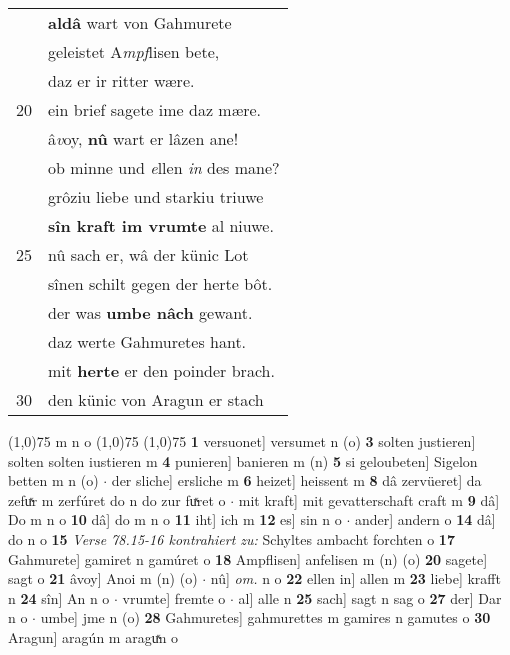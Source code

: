 \documentclass[8pt,a4paper,notitlepage]{article}
\begin{document}
\begin{table}[ht]
\begin{minipage}[t]{0.5\linewidth}
\begin{tabular}{rl}
 & \textbf{aldâ} wart von Gahmurete\\ 
 & geleistet A\textit{mpf}lisen bete,\\ 
 & daz er ir ritter wære.\\ 
20 & ein brief sagete ime daz mære.\\ 
 & â\textit{v}oy, \textbf{nû} wart er lâzen ane!\\ 
 & ob minne und \textit{e}llen \textit{in} des mane?\\ 
 & grôziu liebe und starkiu triuwe\\ 
 & \textbf{sîn kraft im vrumte} al niuwe.\\ 
25 & nû sach er, wâ der künic Lot\\ 
 & sînen schilt gegen der herte bôt.\\ 
 & der was \textbf{umbe nâch} gewant.\\ 
 & daz werte Gahmuretes hant.\\ 
 & mit \textbf{herte} er den poinder brach.\\ 
30 & den künic von Aragun er stach\\ 
\end{tabular}
\scriptsize
\line(1,0){75} \newline
m n o \newline
\line(1,0){75} \newline
\newline
\line(1,0){75} \newline
\textbf{1} versuonet] versumet n (o) \textbf{3} solten justieren] solten solten iustieren m \textbf{4} punieren] banieren m (n) \textbf{5} si geloubeten] Sigelon betten m n (o)  $\cdot$ der sliche] ersliche m \textbf{6} heizet] heissent m \textbf{8} dâ zervüeret] da zefuͯr m zerfúret do n do zur fuͯret o  $\cdot$ mit kraft] mit gevatterschaft craft m \textbf{9} dâ] Do m n o \textbf{10} dâ] do m n o \textbf{11} iht] ich m \textbf{12} es] sin n o  $\cdot$ ander] andern o \textbf{14} dâ] do n o \textbf{15} \textit{Verse 78.15-16 kontrahiert zu:} Schyltes ambacht forchten o  \textbf{17} Gahmurete] gamiret n gamúret o \textbf{18} Ampflisen] anfelisen m (n) (o) \textbf{20} sagete] sagt o \textbf{21} âvoy] Anoi m (n) (o)  $\cdot$ nû] \textit{om.} n o \textbf{22} ellen in] allen m \textbf{23} liebe] krafft n \textbf{24} sîn] An n o  $\cdot$ vrumte] fremte o  $\cdot$ al] alle n \textbf{25} sach] sagt n sag o \textbf{27} der] Dar n o  $\cdot$ umbe] jme n (o) \textbf{28} Gahmuretes] gahmurettes m gamires n gamutes o \textbf{30} Aragun] aragún m araguͯn o \newline
\end{minipage}
\end{table}
\end{document}
